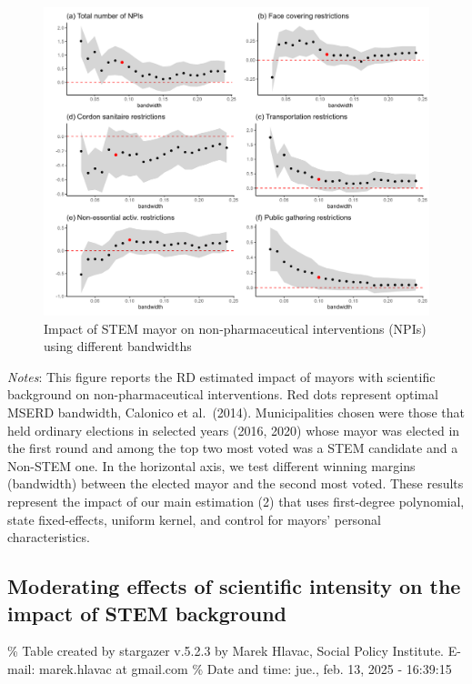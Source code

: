 \documentclass[
  letterpaper,
  DIV=11,
  numbers=noendperiod]{scrartcl}
\begin{document}
\begin{figure}[H]

\caption{Impact of STEM mayor on non-pharmaceutical interventions (NPIs)
using different bandwidths}

{\centering \includegraphics{outputs/figures/npi_rob.png}

}

\end{figure}%

\emph{Notes}: This figure reports the RD estimated impact of mayors with
scientific background on non-pharmaceutical interventions. Red dots
represent optimal MSERD bandwidth, Calonico et al.~(2014).
Municipalities chosen were those that held ordinary elections in
selected years (2016, 2020) whose mayor was elected in the first round
and among the top two most voted was a STEM candidate and a Non-STEM
one. In the horizontal axis, we test different winning margins
(bandwidth) between the elected mayor and the second most voted. These
results represent the impact of our main estimation (2) that uses
first-degree polynomial, state fixed-effects, uniform kernel, and
control for mayors' personal characteristics.

\subsection{Moderating effects of scientific intensity on the impact of
STEM
background}\label{moderating-effects-of-scientific-intensity-on-the-impact-of-stem-background}

\% Table created by stargazer v.5.2.3 by Marek Hlavac, Social Policy
Institute. E-mail: marek.hlavac at gmail.com \% Date and time: jue.,
feb. 13, 2025 - 16:39:15
\end{document}
